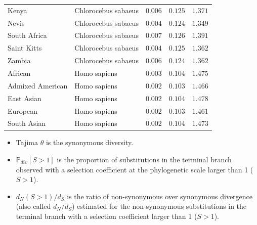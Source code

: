 \documentclass{article}
\newcommand{\dn}{d_N}
\newcommand{\ds}{d_S}
\newcommand{\dnds}{\dn / \ds}
\newcommand{\Sphy}{S}
\begin{document}
\begin{center}
\begin{longtable*}{|l|l|r|r|r|}
            Kenya & Chlorocebus sabaeus & $ 0.006$ & $ 0.125$ & $ 1.371$ \\
            Nevis & Chlorocebus sabaeus & $ 0.004$ & $ 0.124$ & $ 1.349$ \\
            South Africa & Chlorocebus sabaeus & $ 0.007$ & $ 0.126$ & $ 1.391$ \\
            Saint Kitts & Chlorocebus sabaeus & $ 0.004$ & $ 0.125$ & $ 1.362$ \\
            Zambia & Chlorocebus sabaeus & $ 0.006$ & $ 0.124$ & $ 1.362$ \\
            African & Homo sapiens & $ 0.003$ & $ 0.104$ & $ 1.475$ \\
            Admixed American & Homo sapiens & $ 0.002$ & $ 0.103$ & $ 1.466$ \\
            East Asian & Homo sapiens & $ 0.002$ & $ 0.104$ & $ 1.478$ \\
            European & Homo sapiens & $ 0.002$ & $ 0.103$ & $ 1.461$ \\
            South Asian & Homo sapiens & $ 0.002$ & $ 0.104$ & $ 1.473$ \\
        \end{longtable*}
    \end{center}
    \begin{itemize}
        \item Tajima $\theta$ is the synonymous diversity.
        \item $\mathbb{P}_{div}[\Sphy > 1]$ is the proportion of substitutions in the terminal branch observed with a selection coefficient at the phylogenetic scale larger than 1 ($\Sphy > 1$).
        \item $\dn(\Sphy > 1) / \ds$ is the ratio of non-synonymous over synonymous divergence (also called $\dnds$) estimated for the non-synonymous substitutions in the terminal branch with a selection coefficient larger than 1 ($\Sphy > 1$).
    \end{itemize}
\end{document}
